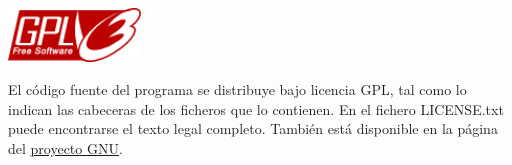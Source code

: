 \vspace{1cm}

\begin{center}
 \includegraphics[width=100pt]{./images/gpl.png}
\end{center}

El código fuente del programa se distribuye bajo licencia GPL, tal como lo indican las cabeceras de los ficheros que lo contienen. En el fichero LICENSE.txt puede encontrarse el texto legal completo. También está disponible en la página del \href{http://www.gnu.org}{proyecto GNU}.
